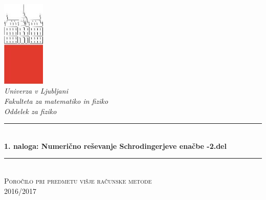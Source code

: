 \documentclass[slovene,11pt,a4paper]{article}
\numberwithin{equation}{section} %
\numberwithin{figure}{section} %
\numberwithin{table}{section} %
\begin{document}
\begin{titlepage}

\newcommand{\HRule}{\rule{\linewidth}{0.5mm}} %

\center %


 

\includegraphics[width=2cm]{slike/aaa}\\[0.5cm]
 
\textit{Univerza v Ljubljani}\\
\textit{Fakulteta za {\color{red}matematiko in fiziko}}\\[0.5cm]

\emph{Oddelek za fiziko}\\[0.5cm] %


\HRule \\[0.4cm]
\huge {\bfseries 1. naloga: Numerično reševanje Schrodingerjeve enačbe -2.del}\\[0.4cm] %
\HRule \\[0.5cm] 

 \textsc{\large Poročilo pri predmetu višje računske metode}\\
 \textsc{\large 2016/2017}\\[1cm] %
 

\end{titlepage}
\end{document}
